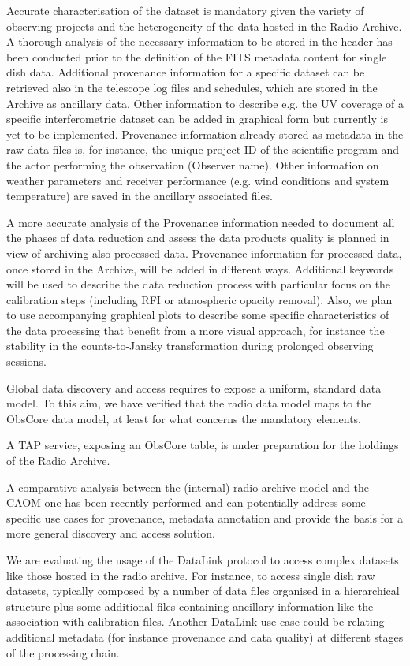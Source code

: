\documentclass[11pt,a4paper]{ivoa}
\begin{document}
Accurate characterisation of the dataset is mandatory given the variety of observing projects and the 
heterogeneity of the data hosted in the Radio Archive. A thorough analysis of the necessary information 
to be stored in the header has been conducted prior to the definition of the FITS metadata content for 
single dish data. Additional provenance information for a specific dataset can be retrieved also in the 
telescope log files and schedules, which are stored in the Archive as ancillary data. Other information 
to describe e.g. the UV coverage of a specific interferometric dataset can be added in graphical form 
but currently is yet to be implemented. Provenance information already stored as metadata in the raw 
data files is, for instance, the unique project ID of the scientific program and the actor performing 
the observation (Observer name). Other information on weather parameters and receiver performance (e.g. 
wind conditions and system temperature) are saved in the ancillary associated files.

A more accurate analysis of the Provenance information needed to document all the phases of data 
reduction and assess the data products quality is planned in view of archiving also processed data.  
Provenance information for processed data, once stored in the Archive, will be added in different ways. 
Additional keywords will be used to describe the data reduction process with particular focus on the 
calibration steps (including RFI or atmospheric opacity removal). Also, we plan to use accompanying 
graphical plots to describe some specific characteristics of the data processing that benefit from a 
more visual approach, for instance the stability in the counts-to-Jansky transformation during prolonged 
observing sessions.

Global data discovery and access requires to expose a uniform, standard data model. To this aim, we have 
verified that the radio data model maps to the ObsCore data model, at least  for what concerns the 
mandatory elements.

A TAP service, exposing an ObsCore table, is under preparation for the holdings of the Radio Archive.

A comparative analysis between the (internal) radio archive model and the CAOM one has been recently 
performed and can potentially address some specific use cases for provenance, metadata annotation and 
provide the basis for a more general discovery and access solution.

We are evaluating the usage of the DataLink protocol to access complex datasets like those hosted in the 
radio archive. For instance, to access single dish raw datasets, typically composed by a number of data 
files organised in a hierarchical structure plus some additional files containing ancillary information 
like the association with calibration files. Another DataLink use case could be relating additional 
metadata (for instance provenance and data quality) at different stages of the processing chain.
\end{document}
